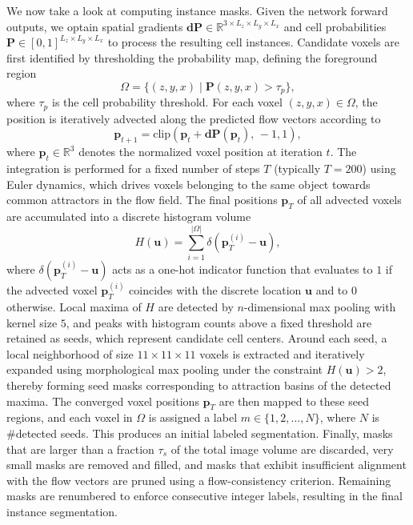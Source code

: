 We now take a look at computing instance masks. Given the network forward outputs, we optain spatial gradients $\mathbf{dP} \in \mathbb{R}^{3 \times L_z \times L_y \times L_x}$ and cell probabilities $\mathbf{P} \in [0,1]^{L_z \times L_y \times L_x}$ to process the resulting cell instances. Candidate voxels are first identified by thresholding the probability map, defining the foreground region
\begin{equation}
\Omega = \{ (z,y,x) \mid \mathbf{P}(z,y,x) > \tau_p \},
\end{equation}
where $\tau_p$ is the cell probability threshold. For each voxel $(z,y,x) \in \Omega$, the position is iteratively advected along the predicted flow vectors according to
\begin{equation}
\mathbf{p}_{t+1} = \mathrm{clip}\!\left( \mathbf{p}_{t} + \mathbf{dP}(\mathbf{p}_{t}), \, -1, 1 \right),
\end{equation}
where $\mathbf{p}_t \in \mathbb{R}^3$ denotes the normalized voxel position at iteration $t$. The integration is performed for a fixed number of steps $T$ (typically $T=200$) using Euler dynamics, which drives voxels belonging to the same object towards common attractors in the flow field. The final positions $\mathbf{p}_T$ of all advected voxels are accumulated into a discrete histogram volume
\begin{equation}
H(\mathbf{u}) = \sum_{i=1}^{|\Omega|} \delta(\mathbf{p}_T^{(i)} - \mathbf{u}),
\end{equation}
where $\delta(\mathbf{p}_T^{(i)} - \mathbf{u})$ acts as a one-hot indicator function that evaluates to $1$ if the advected voxel $\mathbf{p}_T^{(i)}$ coincides with the discrete location $\mathbf{u}$ and to $0$ otherwise. Local maxima of $H$ are detected by $n$-dimensional max pooling with kernel size $5$, and peaks with histogram counts above a fixed threshold are retained as seeds, which represent candidate cell centers. Around each seed, a local neighborhood of size $11 \times 11 \times 11$ voxels is extracted and iteratively expanded using morphological max pooling under the constraint $H(\mathbf{u}) > 2$, thereby forming seed masks corresponding to attraction basins of the detected maxima. The converged voxel positions $\mathbf{p}_T$ are then mapped to these seed regions, and each voxel in $\Omega$ is assigned a label $m \in \{1,2,\dots,N\}$, where $N$ is \#detected seeds. This produces an initial labeled segmentation.
Finally, masks that are larger than a fraction $\tau_s$ of the total image volume are discarded, very small masks are removed and filled, and masks that exhibit insufficient alignment with the flow vectors are pruned using a flow-consistency criterion. Remaining masks are renumbered to enforce consecutive integer labels, resulting in the final instance segmentation.


